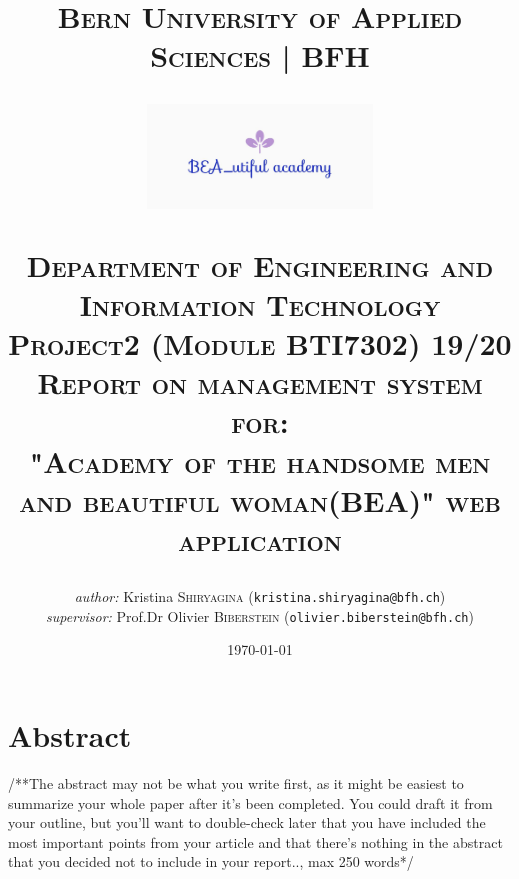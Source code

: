 \documentclass{scrartcl}
\begin{document}
\begin{titlepage}


\title{\textsc{\LARGE Bern University of Applied Sciences | BFH }\\[1cm]
\begin{center}
\includegraphics[width = 60mm]{bea_logo.JPG}
\end{center}
\textsc{\small Department of Engineering and Information Technology}\\
\textsc{\small Project2 (Module BTI7302) 19/20}\\[1cm]
\textsc{\small Report on management system for: }\\
\textsc{"Academy of the handsome men and beautiful woman(BEA)" web application}}
\date{\today}   %
\author{\textit{author: }Kristina \textsc{Shiryagina} (\texttt{kristina.shiryagina@bfh.ch}) \\
 \textit{supervisor: } Prof.Dr Olivier  \textsc{Biberstein}  (\texttt{olivier.biberstein@bfh.ch})\\
 }
\maketitle	
	
\tableofcontents
\clearpage
\end{titlepage}


\section{Abstract}
/**The abstract may not be what you write first, as it might be easiest to summarize your whole paper after it's been completed. You could draft it from your outline, but you'll want to double-check later that you have included the most important points from your article and that there's nothing in the abstract that you decided not to include in your report.., max 250 words*/\\
\end{document}
